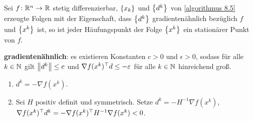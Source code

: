 \begin{satz}
	Sei $\abb{f}{\Rn}{\R}$ stetig differenzierbar, $\left\{ x_k \right\}_{}$ und $\left\{ d^k \right\}_{}$ von \cref{algorithmus 8.5} erzeugte Folgen mit der Eigenschaft, dass $\left\{ d^k \right\}_{}$ gradientenähnlich bezüglich $f$ und $\left\{ x^k \right\}_{}$ ist, so ist jeder Häufungspunkt der Folge $\left\{ x^k \right\}_{}$ ein stationärer Punkt von $f$.
	
	\textbf{gradientenähnlich}: es existieren Konstanten $c > 0$ und $\epsilon > 0$, sodass für alle $k \in \mathbb{N}$ gilt $\left\lVert d^k \right\rVert \le c$ und $\nabla f(x^k)^{\top} d \le - \varepsilon$ für alle $k \in \mathbb{N}$ hinreichend groß.
\end{satz}

\begin{beispiel}
	\begin{enumerate}[label=(\alph*), leftmargin=*, nolistsep]
		\item $d^k = - \nabla f(x^k)$.
		\item Sei $H$ positiv definit und symmetrisch. Setze $d^k = -H^{-1} \nabla f(x^k)$, $\nabla f(x^k)^{\top} d^k = - \nabla f(x^k)^{\top} H^{-1} \nabla f(x^k) < 0$.
	\end{enumerate}
\end{beispiel}